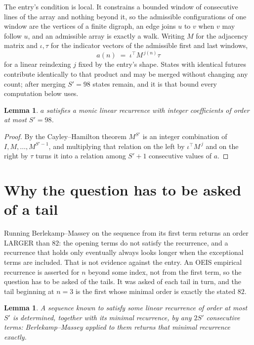 \documentclass[11pt,a4paper]{article}
\theoremstyle{plain}
\newtheorem{lemma}[theorem]{Lemma}
\theoremstyle{definition}
\begin{document}
The entry's condition is local. It constrains a bounded window of consecutive lines of the
array and nothing beyond it, so the admissible configurations of one window are the vertices of
a finite digraph, an edge joins $u$ to $v$ when $v$ may follow $u$, and an admissible array is
exactly a walk. Writing $M$ for the adjacency matrix and $\iota,\tau$ for the indicator vectors
of the admissible first and last windows,
\[
a(n)\;=\;\iota^{\!\top}M^{\,j(n)}\tau
\]
for a linear reindexing $j$ fixed by the entry's shape. States with identical futures
contribute identically to that product and may be merged without changing any count; after
merging $S'=98$ states remain, and it is that bound every computation below uses.

\begin{lemma}\label{lem:cf}
$a$ satisfies a monic linear recurrence with integer coefficients of order at most $S'=98$.
\end{lemma}

\begin{proof}
By the Cayley--Hamilton theorem $M^{S'}$ is an integer combination of $I,M,\dots,M^{S'-1}$,
and multiplying that relation on the left by $\iota^{\!\top}M^{\,j}$ and on the right by
$\tau$ turns it into a relation among $S'+1$ consecutive values of $a$.
\end{proof}

\section{Why the question has to be asked of a tail}

Running Berlekamp--Massey on the sequence from its first term returns an order LARGER than $82$: the opening terms do not satisfy the recurrence, and a recurrence that holds only eventually always looks longer when the exceptional terms are included. That is not evidence against the entry. An OEIS empirical recurrence is asserted for $n$ beyond some index, not from the first term, so the question has to be asked of the tails. It was asked of each tail in turn, and the tail beginning at $n=3$ is the first whose minimal order is exactly the stated $82$.

\begin{lemma}\label{lem:bm}
A sequence known to satisfy some linear recurrence of order at most $S'$ is determined,
together with its minimal recurrence, by any $2S'$ consecutive terms: Berlekamp--Massey applied
to them returns that minimal recurrence exactly.
\end{lemma}
\end{document}

